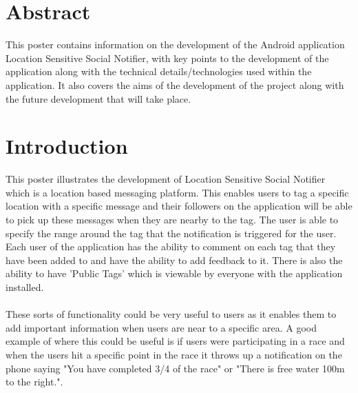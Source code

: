 \documentclass[a0,landscape]{a0poster}
\begin{document}
\begin{multicols}{5} %

\color{Navy}
\section{Abstract}

This poster contains information on the development of the Android application Location Sensitive Social Notifier, with key points to the development of the application along with the technical details/technologies used within the application. It also covers the aims of the development of the project along with the future development that will take place.

\vspace{-10pt}
\color{Olive}
\section{Introduction}

This poster illustrates the development of Location Sensitive Social Notifier which is a location based messaging platform. This enables users to tag a specific location with a specific message and their followers on the application will be able to pick up these messages when they are nearby to the tag. The user is able to specify the range around the tag that the notification is triggered for the user. Each user of the application has the ability to comment on each tag that they have been added to and have the ability to add feedback to it. There is also the ability to have 'Public Tags' which is viewable by everyone with the application installed.\\
\\
These sorts of functionality could be very useful to users as it enables them to add important information when users are near to a specific area. A good example of where this could be useful is if users were participating in a race and when the users hit a specific point in the race it throws up a notification on the phone saying "You have completed 3/4 of the race" or "There is free water 100m to the right.".\\


\end{multicols}
\end{document}
